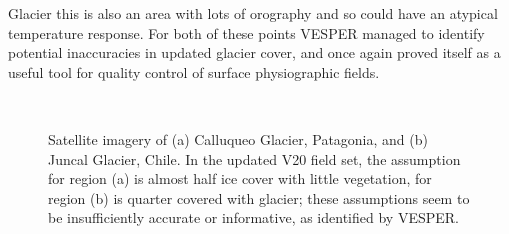 \documentclass[hess, twostagejnl]{copernicus}
\begin{document}
Glacier this is also an area with lots of orography and so could have an atypical temperature response. For both of these points VESPER managed  to identify potential inaccuracies in updated glacier cover, and once again proved itself as a useful tool for quality control of surface physiographic fields. 
	\begin{figure}[h!]
	 \\
	\caption{Satellite imagery of (a) Calluqueo Glacier, Patagonia, and (b) Juncal Glacier, Chile. In the updated V20 field set, the assumption for region (a) is almost half ice cover with little vegetation, for region (b) is quarter covered with glacier; these assumptions seem to be insufficiently accurate or informative, as identified by VESPER.
	} 
	\label{fig:glacier}
\end{figure}

\end{document}
